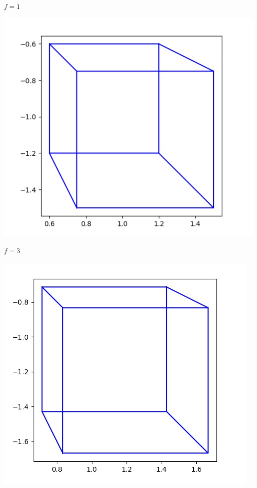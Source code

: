 \documentclass[11pt,class=report,crop=false]{standalone}
\begin{document}
\begin{activite}[Perspective]
\begin{enumerate}
\begin{center}
\begin{minipage}{0.2\textwidth}
\begin{center}
		$f=1$
	\end{center}
	\end{minipage}
	\begin{minipage}{0.2\textwidth}
	\begin{center}
		\includegraphics[scale=\myscale,scale=0.25]{ecran-perspective-6-3}
		
		$f=3$
	\end{center}
	\end{minipage}
	\begin{minipage}{0.2\textwidth}
	\begin{center}
		\includegraphics[scale=\myscale,scale=0.25]{ecran-perspective-6-5}
		

\end{center}
\end{minipage}
\end{center}
\end{enumerate}
\end{activite}
\end{document}
